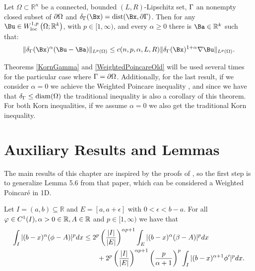 \begin{theorem} \label{WeightedPoincareOld} Let $\Omega \subset \mathbb{R}^n$ be a connected, bounded $(L, R)$-Lipschitz set,  $\Gamma$ an nonempty closed subset of $\partial\Omega$  and $\delta_\GG(\Bx)=\dist(\Bx, \partial\GG)$. Then for any $\Bu \in W_{\mathrm{loc}}^{1, p}\left(\Omega ; \mathbb{R}^k\right)$, with $p \in[1, \infty)$, and every $\alpha\geq 0$ there is $\Ba \in \mathbb{R}^k$ such that:
    $$
    \|\delta_\GG(\Bx)^\alpha (\Bu-\Ba)\|_{L^p(\Omega)} \leq c(n,p,\alpha,L,R)\|\Gd_\GG(\Bx)^{1+\Ga} \nabla \Bu\|_{L^p(\Omega)} .
    $$
\end{theorem}

    \begin{remark}
    Theorems \ref{KornGamma} and \ref{WeightedPoincareOld} will be used several times for the particular case where $\Gamma=\partial\Omega$. Additionally, for the last result, if we consider $\alpha=0$  we achieve the Weighted Poincare inequality \cite[Theorem~5.5]{conti0}, and since we have that $\delta_\Gamma\leq \operatorname{diam}(\Omega)$ the traditional inequality is also a corollary of this theorem. For both Korn inequalities, if we assume $\alpha=0$ we also get the traditional Korn inequality.
    \end{remark}
 
\section{Auxiliary Results and Lemmas}
\label{sec:auxWKorn}
The main results of this chapter are inspired by the proofs of \cite{conti0}, so the first step is to generalize Lemma 5.6 from that paper, which can be considered a Weighted Poincaré
  in 1D.

\begin{lemma}
\label{1dimPoinc}
Let $I=(a, b) \subseteq \mathbb{R}$ and  $E=[a,a+\epsilon]$ with $0<\epsilon< b-a$. For all $\varphi \in C^1(I),\alpha > 0 \in \mathbb{R}, A\in\mathbb{R} $ and   $p \in[1, \infty)$ we have that 
\begin{align*}
\int_I|(b-x)^\alpha(\phi-A)|^p d x &\leq 2^p \left(\frac{|I|}{|E|}\right)^{\alpha p+1}\int_E|(b-x)^\alpha(\beta-A)|^p d x\\ &\qquad+2^p \left(\frac{|I|}{|E|}\right)^{\alpha p+1}\left(\frac{p}{\alpha+1}\right)^p\int_I|(b-x)^{\alpha+1}\phi'|^p d x.
\end{align*}
\end{lemma}

